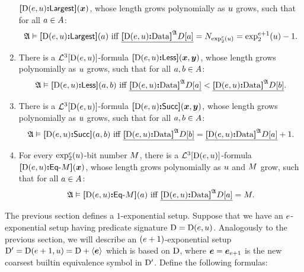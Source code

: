 \begin{definition}
\begin{enumerate}[label=E\arabic*]
  ${\bm{[}{\mathrm{D}}(e,u)\mathord{\bm{:}}\mathsf{Largest}\bm{]}}(\bm{x})$, whose length grows polynomially as $u$ grows,
  such that for all $a \in A$:
  \[
    \miff{
      \StrA \vDash \fLargest{\DS(\sze,\szu)}(\ea)}{
      \bdec{\Data{\DS(\sze,\szu)}\StrA\relD[\ea]} = \largtbit{\tetr\sze2\szu} =
      \tetr{\sze+1}2\szu-1}.
  \]
  \item\label{eset:6} There is a $\mathcal{L}^{3}[{\mathrm{D}}(e,u)]$-formula
  ${\bm{[}{\mathrm{D}}(e,u)\mathord{\bm{:}}\mathsf{Less}\bm{]}}(\bm{x},\bm{y})$, whose length grows polynomially as $u$
  grows, such that for all $a, b \in A$:
  \[
    \miff{
      \StrA \vDash \fLess{\DS(\sze,\szu)}(\ea,\eb)}{
      \bdec{\Data{\DS(\sze,\szu)}\StrA\relD[\ea]} <
      \bdec{\Data{\DS(\sze,\szu)}\StrA\relD[\eb]}}.
  \]
  \item\label{eset:7} There is a $\mathcal{L}^{3}[{\mathrm{D}}(e,u)]$-formula
  ${\bm{[}{\mathrm{D}}(e,u)\mathord{\bm{:}}\mathsf{Succ}\bm{]}}(\bm{x},\bm{y})$, whose length grows polynomially as $u$
  grows, such that for all $a, b \in A$:
  \[
    \miff{
      \StrA \vDash \fSucc{\DS(\sze,\szu)}(\ea,\eb)}{
      \bdec{\Data{\DS(\sze,\szu)}\StrA\relD[\eb]} =
      \bdec{\Data{\DS(\sze,\szu)}\StrA\relD[\ea]} + 1}.
  \]
  \item\label{eset:8} For every $\exp_{2}^{e}(u)$-bit number $M$, there is a
  $\mathcal{L}^{3}[{\mathrm{D}}(e,u)]$-formula
  ${\bm{[}{\mathrm{D}}(e,u)\mathord{\bm{:}}\mathsf{Eq}{\hbox{-}}M\bm{]}}(\bm{x})$, whose length grows polynomially as $u$
  and $M$ grow, such that for all $a \in  A$:
  \[
    \miff{
      \StrA \vDash \fDataA{\DS(\sze,\szu)}\nM(\ea)}{
      \bdec{\Data{\DS(\sze,\szu)}\StrA\relD[\ea]} = \nM}.
  \]
\end{enumerate}
\end{definition}
The previous section defines a $1$-exponential setup.
Suppose that we have an $e$-exponential setup having predicate signature
${\mathrm{D}} = {\mathrm{D}}(e,u)$. Analogously to the previous section, we will describe an
$(e+1)$-exponential setup ${\mathrm{D'}} = {\mathrm{D}}(e+1,u) = {\mathrm{D}} + \left\langle \bm{e} \right\rangle$ which
is based on ${\mathrm{D}}$, where $\bm{e} = \bm{e}_{e+1}$ is the new coarsest builtin
equivalence symbol in ${\mathrm{D'}}$. Define the following formulas:
